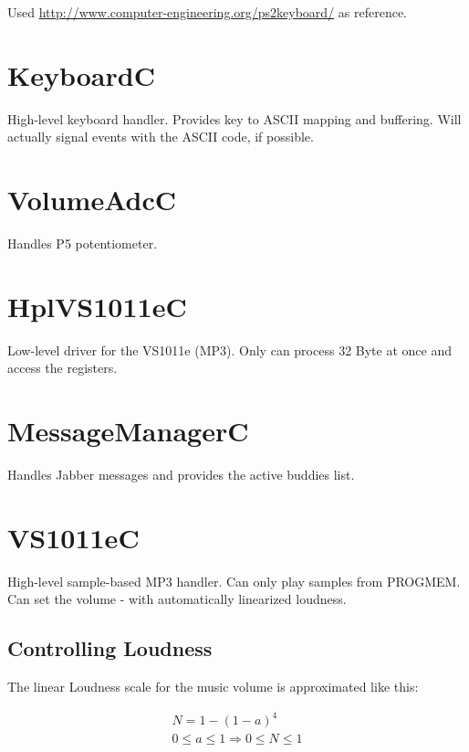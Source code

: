 \documentclass[12pt,a4paper,titlepage,oneside]{article}
\begin{document}
Used \hyperref[PS2Keyboard]{http://www.computer-engineering.org/ps2keyboard/} as reference.

\section{KeyboardC}

High-level keyboard handler. Provides key to ASCII mapping and buffering. Will actually signal events with the ASCII code, if possible.

\section{VolumeAdcC}

Handles P5 potentiometer.

\section{HplVS1011eC}

Low-level driver for the VS1011e (MP3). Only can process 32 Byte at
once and access the registers.

\section{MessageManagerC}

Handles Jabber messages and provides the active buddies list.

\section{VS1011eC}

High-level sample-based MP3 handler. Can only play samples from PROGMEM. Can set the volume - with automatically linearized loudness.

\subsection{Controlling Loudness}

The linear Loudness scale for the music volume is approximated like this:

\begin{eqnarray*}
N = 1 - (1 - a)^4 \\
0 \le a \le 1 \Rightarrow 0 \le N \le 1
\end{eqnarray*}
\end{document}
